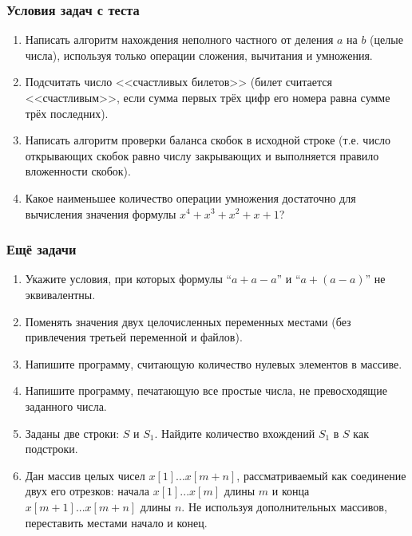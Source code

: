\documentclass{../../slides-style}
\begin{document}
    \begin{frame}
        \frametitle{Условия задач с теста}
        \begin{enumerate}
            \item Написать алгоритм нахождения неполного частного от деления $a$ на $b$ (целые числа), используя только операции сложения, вычитания и умножения.
            \item Подсчитать число <<счастливых билетов>> (билет считается <<счастливым>>, если сумма первых трёх цифр его номера равна сумме трёх последних).
            \item Написать алгоритм проверки баланса скобок в исходной строке (т.е. число открывающих скобок равно числу закрывающих и выполняется правило вложенности скобок).
            \item Какое наименьшее количество операции умножения достаточно для вычисления значения формулы $x^4 + x^3 + x^2 + x + 1$?
        \end{enumerate}
    \end{frame}

    \begin{frame}
        \frametitle{Ещё задачи}
        \begin{enumerate}
            \item Укажите условия, при которых формулы ``$a + a - a$'' и ``$a + (a - a)$'' не эквивалентны.
            \item Поменять значения двух целочисленных переменных местами (без привлечения третьей переменной и файлов).
            \item Напишите программу, считающую количество нулевых элементов в массиве.
            \item Напишите программу, печатающую все простые числа, не превосходящие заданного числа.
            \item Заданы две строки: $S$ и $S_1$. Найдите количество вхождений $S_1$ в $S$ как подстроки.
            \item Дан массив целых чисел $x[1]...x[m+n]$, рассматриваемый как соединение двух его отрезков: начала $x[1]...x[m]$ длины $m$ и конца $x[m+1]...x[m+n]$ длины $n$. Не используя дополнительных массивов, переставить местами начало и конец.
        \end{enumerate}
    \end{frame}
\end{document}
